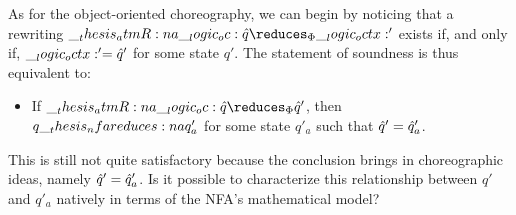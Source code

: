 As for the object-oriented choreography, we can begin by noticing that a rewriting $\atmR{a} \oc \defp{q} \reduces_{\orsig} \octx'$ exists if, and only if, $\__logic_octx:' = \hat{q}'$ for some state $q'$.
The statement of soundness is thus equivalent to:
\begin{itemize}
\item
  If $\atmR{a} \oc \defp{q} \reduces_{\orsig} \defp{q}'$, then $q \nfareduces[a] q'_a$ for some state $q'_a$ such that $\hat{q}' = \hat{q}'_a$.
\end{itemize}
This is still not quite satisfactory because the conclusion brings in choreographic ideas, namely $\hat{q}' = \hat{q}'_a$.
Is it possible to characterize this relationship between $q'$ and $q'_a$ natively in terms of the \ac{NFA}'s mathematical model?



